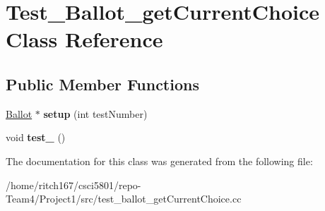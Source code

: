 \hypertarget{classTest__Ballot__getCurrentChoice}{}\section{Test\+\_\+\+Ballot\+\_\+get\+Current\+Choice Class Reference}
\label{classTest__Ballot__getCurrentChoice}
\subsection*{Public Member Functions}
\begin{DoxyCompactItemize}
\item 
\mbox{\label{classTest__Ballot__getCurrentChoice_ad63b33ec213f84aca0d64bad33e62427}} 
\hyperlink{classBallot}{Ballot} $\ast$ {\bfseries setup} (int test\+Number)
\item 
\mbox{\label{classTest__Ballot__getCurrentChoice_ae6170cb4591be0631d5bef687a97bb2b}} 
void {\bfseries test\+\_} ()
\end{DoxyCompactItemize}


The documentation for this class was generated from the following file\+:\begin{DoxyCompactItemize}
\item 
/home/ritch167/csci5801/repo-\/\+Team4/\+Project1/src/test\+\_\+ballot\+\_\+get\+Current\+Choice.\+cc\end{DoxyCompactItemize}
